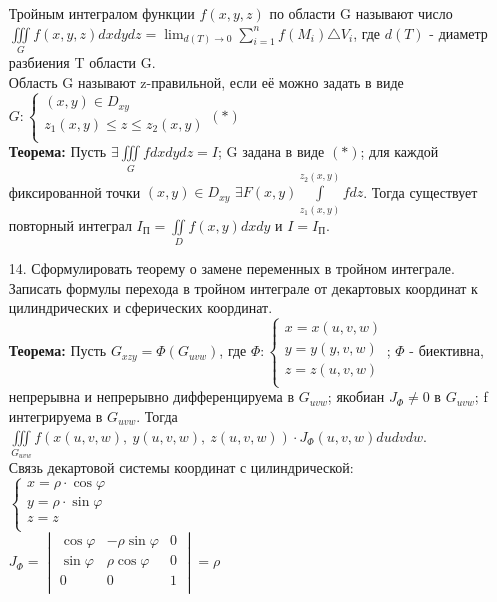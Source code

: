 \documentclass[a4paper]{article}
\begin{document}
\begin{enumerate}
Тройным интегралом функции $f(x,y,z)$ по области G называют число $\displaystyle  \iiint\limits_G f(x,y,z) dxdydz = \lim_{d(T) \to 0} \sum\limits_{i = 1}^{n} f(M_i) \triangle V_i$, где $d(T)$ - диаметр разбиения T области G. \\
Область G называют z-правильной, если её можно задать в виде $G: 
\begin{cases}
	(x,y) \in D_{xy} \\
	z_1(x,y) \leqslant z \leqslant z_2(x,y) \\
\end{cases} (*)$ \\
\textbf{Теорема:} Пусть $\displaystyle  \exists \iiint\limits_G f dxdydz = I$; G задана в виде $(*)$; для каждой фиксированной точки $(x,y) \in D_{xy}$ $\displaystyle  \exists F(x,y) \int\limits_{z_1(x,y)}^{z_2(x,y)} f dz$. Тогда существует повторный интеграл $\displaystyle  I_\text{П} = \iint\limits_D f(x,y) dxdy$ и $I = I_\text{П}$. \\



\item[14.] Сформулировать теорему о замене переменных в тройном интеграле. Записать формулы перехода в тройном интеграле от декартовых координат к цилиндрических и сферических координат. \\

\textbf{Теорема:} Пусть $G_{xzy} = \Phi(G_{uvw})$, где $\Phi: 
\begin{cases}
	x = x(u,v,w) \\
	y = y(y,v,w) \\
	z = z(u,v,w) \\
\end{cases}$;
$\Phi$ - биективна, непрерывна и непрерывно дифференцируема в $G_{uvw}$; якобиан $J_\Phi \neq 0$ в $G_{uvw}$; f интегрируема в $G_{uvw}$. Тогда $\displaystyle  \iiint\limits_{G_{uvw}} f \left( x(u,v,w), \ y(u,v,w), \ z(u,v,w) \right) \cdot J_\Phi (u,v,w) dudvdw$. \\
Связь декартовой системы координат с цилиндрической: \\
$\begin{cases}
	x = \rho \cdot \cos{\varphi} \\
	y = \rho \cdot \sin{\varphi} \\
	z = z \\
\end{cases}$ \\
$J_\Phi = 
\begin{vmatrix}
	\cos{\varphi} & -\rho \sin{\varphi} & 0 \\
	\sin{\varphi} & \rho \cos{\varphi} & 0 \\
	0 & 0 & 1 \\
\end{vmatrix} = \rho$ \\


\end{enumerate}
\end{document}
